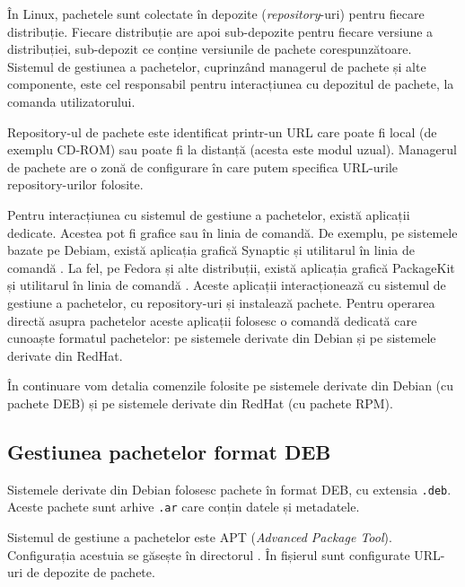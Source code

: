 În Linux, pachetele sunt colectate în depozite (\textit{repository}-uri) pentru fiecare distribuție.
Fiecare distribuție are apoi sub-depozite pentru fiecare versiune a distribuției, sub-depozit ce conține versiunile de pachete corespunzătoare.
Sistemul de gestiunea a pachetelor, cuprinzând managerul de pachete și alte componente, este cel responsabil pentru interacțiunea cu depozitul de pachete, la comanda utilizatorului.

Repository-ul de pachete este identificat printr-un URL care poate fi local (de exemplu CD-ROM) sau poate fi la distanță (acesta este modul uzual).
Managerul de pachete are o zonă de configurare în care putem specifica URL-urile repository-urilor folosite.

Pentru interacțiunea cu sistemul de gestiune a pachetelor, există aplicații dedicate.
Acestea pot fi grafice sau în linia de comandă.
De exemplu, pe sistemele bazate pe Debiam, există aplicația grafică Synaptic și utilitarul în linia de comandă .
La fel, pe Fedora și alte distribuții, există aplicația grafică PackageKit și utilitarul în linia de comandă .
Aceste aplicații interacționează cu sistemul de gestiune a pachetelor, cu repository-uri și instalează pachete.
Pentru operarea directă asupra pachetelor aceste aplicații folosesc o comandă dedicată care cunoaște formatul pachetelor:  pe sistemele derivate din Debian și  pe sistemele derivate din RedHat.

În continuare vom detalia comenzile folosite pe sistemele derivate din Debian (cu pachete DEB) și pe sistemele derivate din RedHat (cu pachete RPM).

\subsection{Gestiunea pachetelor format DEB}
\label{sec:package:deb}

Sistemele derivate din Debian folosesc pachete în format DEB, cu extensia \texttt{.deb}.
Aceste pachete sunt arhive \texttt{.ar} care conțin datele și metadatele.

Sistemul de gestiune a pachetelor este APT  (\textit{Advanced Package Tool}).
Configurația acestuia se găsește în directorul .
În fișierul  sunt configurate URL-uri de depozite de pachete.


